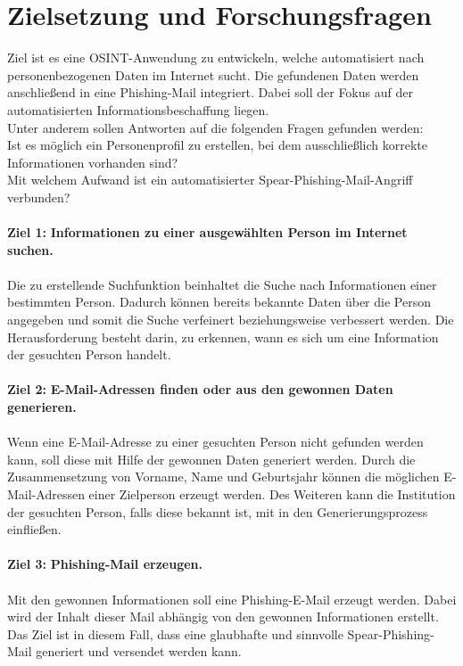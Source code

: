 \section{Zielsetzung und Forschungsfragen}
\label {sec:Zielsetzung}
Ziel ist es eine OSINT-Anwendung zu entwickeln, welche automatisiert nach personenbezogenen Daten im Internet sucht. Die gefundenen Daten werden anschließend in eine Phishing-Mail integriert. Dabei soll der Fokus auf der automatisierten Informationsbeschaffung liegen.\\ 
Unter anderem sollen Antworten auf die folgenden Fragen gefunden werden:\\ Ist es möglich ein Personenprofil zu erstellen, bei dem ausschließlich korrekte Informationen vorhanden sind? \\
Mit welchem Aufwand ist ein automatisierter Spear-Phishing-Mail-Angriff verbunden?
 \\\\
 {\bf Ziel 1:} \textbf{Informationen zu einer ausgewählten Person im Internet suchen.}\\\\
 Die zu erstellende Suchfunktion beinhaltet die Suche nach Informationen einer bestimmten Person. Dadurch können bereits bekannte Daten über die Person angegeben und somit die Suche verfeinert beziehungsweise verbessert werden. Die Herausforderung besteht darin, zu erkennen, wann es sich um eine Information der gesuchten Person handelt.\\\\
 {\bf Ziel 2:} \textbf{E-Mail-Adressen finden oder aus den gewonnen Daten generieren.}\\\\
 Wenn eine E-Mail-Adresse zu einer gesuchten Person nicht gefunden werden kann, soll diese mit Hilfe der gewonnen Daten generiert werden. Durch die Zusammensetzung von Vorname, Name und Geburtsjahr können die möglichen E-Mail-Adressen einer Zielperson erzeugt werden. Des Weiteren kann die Institution der gesuchten Person, falls diese bekannt ist, mit in den Generierungsprozess einfließen.\\\\
 {\bf Ziel 3:} \textbf{Phishing-Mail erzeugen.}\\\\
 Mit den gewonnen Informationen soll eine Phishing-E-Mail erzeugt werden. Dabei wird der Inhalt dieser Mail abhängig von den gewonnen Informationen erstellt. Das Ziel ist in diesem Fall, dass eine glaubhafte und sinnvolle Spear-Phishing-Mail generiert und versendet werden kann.
 


